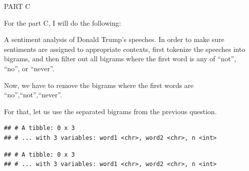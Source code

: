 \documentclass[]{article}
\newenvironment{Shaded}{\begin{snugshade}}{\end{snugshade}}
\newcommand{\KeywordTok}[1]{\textcolor[rgb]{0.13,0.29,0.53}{\textbf{#1}}}
\newcommand{\StringTok}[1]{\textcolor[rgb]{0.31,0.60,0.02}{#1}}
\newcommand{\CommentTok}[1]{\textcolor[rgb]{0.56,0.35,0.01}{\textit{#1}}}
\newcommand{\OperatorTok}[1]{\textcolor[rgb]{0.81,0.36,0.00}{\textbf{#1}}}
\newcommand{\NormalTok}[1]{#1}
\begin{document}
PART C

For the part C, I will do the following:

A sentiment analysis of Donald Trump's speeches. In order to make sure
sentiments are assigned to appropriate contexts, first tokenize the
speeches into bigrams, and then filter out all bigrams where the first
word is any of ``not'', ``no'', or ``never''.

Now, we have to remove the bigrams where the first words are
``no'',``not'',``never''.

For that, let us use the separated bigrams from the previous question.

\begin{Shaded}
\end{Shaded}

\begin{verbatim}
## # A tibble: 0 x 3
## # ... with 3 variables: word1 <chr>, word2 <chr>, n <int>
\end{verbatim}

\begin{Shaded}
\end{Shaded}

\begin{verbatim}
## # A tibble: 0 x 3
## # ... with 3 variables: word1 <chr>, word2 <chr>, n <int>
\end{verbatim}
\end{document}
